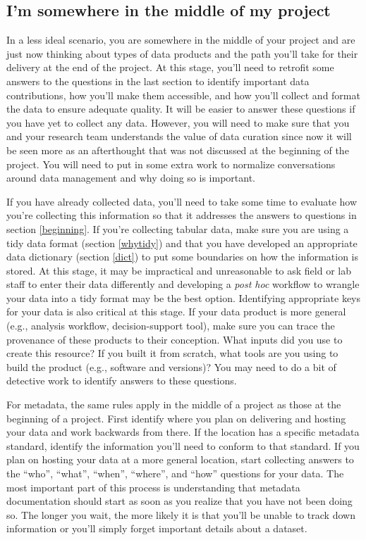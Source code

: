 \documentclass[
]{book}
\begin{document}
\hypertarget{middleproject}{%
\subsection{I'm somewhere in the middle of my project}\label{middleproject}}

In a less ideal scenario, you are somewhere in the middle of your project and are just now thinking about types of data products and the path you'll take for their delivery at the end of the project. At this stage, you'll need to retrofit some answers to the questions in the last section to identify important data contributions, how you'll make them accessible, and how you'll collect and format the data to ensure adequate quality. It will be easier to answer these questions if you have yet to collect any data. However, you will need to make sure that you and your research team understands the value of data curation since now it will be seen more as an afterthought that was not discussed at the beginning of the project. You will need to put in some extra work to normalize conversations around data management and why doing so is important.

If you have already collected data, you'll need to take some time to evaluate how you're collecting this information so that it addresses the answers to questions in section \ref{beginning}. If you're collecting tabular data, make sure you are using a tidy data format (section \ref{whytidy}) and that you have developed an appropriate data dictionary (section \ref{dict}) to put some boundaries on how the information is stored. At this stage, it may be impractical and unreasonable to ask field or lab staff to enter their data differently and developing a \emph{post hoc} workflow to wrangle your data into a tidy format may be the best option. Identifying appropriate keys for your data is also critical at this stage. If your data product is more general (e.g., analysis workflow, decision-support tool), make sure you can trace the provenance of these products to their conception. What inputs did you use to create this resource? If you built it from scratch, what tools are you using to build the product (e.g., software and versions)? You may need to do a bit of detective work to identify answers to these questions.

For metadata, the same rules apply in the middle of a project as those at the beginning of a project. First identify where you plan on delivering and hosting your data and work backwards from there. If the location has a specific metadata standard, identify the information you'll need to conform to that standard. If you plan on hosting your data at a more general location, start collecting answers to the ``who'', ``what'', ``when'', ``where'', and ``how'' questions for your data. The most important part of this process is understanding that metadata documentation should start as soon as you realize that you have not been doing so. The longer you wait, the more likely it is that you'll be unable to track down information or you'll simply forget important details about a dataset.
\end{document}
